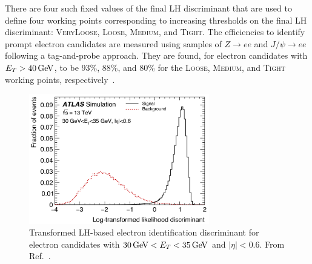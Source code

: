 There are four such fixed values of the final LH discriminant that are used to define
four working points corresponding to increasing thresholds on the final LH discriminant:
\textsc{VeryLoose}, \textsc{Loose}, \textsc{Medium}, and \textsc{Tight}.
The efficiencies to identify prompt electron candidates are measured using samples of $Z\rightarrow ee$ and
$J/\psi \rightarrow ee$ following a tag-and-probe approach.
They are found, for electron candidates with $E_T > 40\,\text{Ge\kern -0.1em V}$,
to be 93\%, 88\%, and 80\% for the \textsc{Loose}, \textsc{Medium}, and \textsc{Tight} working points, respectively~\cite{Aad:2019tso}.

\begin{figure}[!htb]
    \begin{center}
    \includegraphics[width=0.7\textwidth]{figures/chapter3/egamma/egamma_lh_discriminant}
    \caption{
        Transformed LH-based electron identification discriminant for electron candidates
        with $30\,\text{Ge\kern -0.1em V} < E_T < 35\,\text{Ge\kern -0.1em V}$ and $\lvert \eta \rvert < 0.6$.
        From Ref.~\cite{Aaboud:2657964}.
    }
    \label{fig:egamma_lh_discriminant}
    \end{center}
\end{figure}


\FloatBarrier

